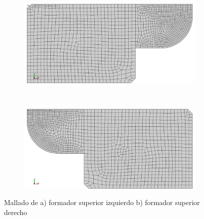 \begin{figure}[H]
\centering
\begin{subfigure}[t]{0.4\textwidth}
	\centering
	\includegraphics[width=\textwidth]{src/ch3/mesh_fs_izq_2d.png}
	\caption{}
	\label{fig:mesh_fs_izq_2d}
\end{subfigure}
~
\begin{subfigure}[t]{0.4\textwidth}
	\centering
	\includegraphics[width=\textwidth]{src/ch3/mesh_fs_der_2d.png}
	\caption{}
	\label{fig:mesh_fs_der_2d}
\end{subfigure}
\caption{Mallado de a) formador superior izquierdo b) formador superior derecho}
\end{figure}


